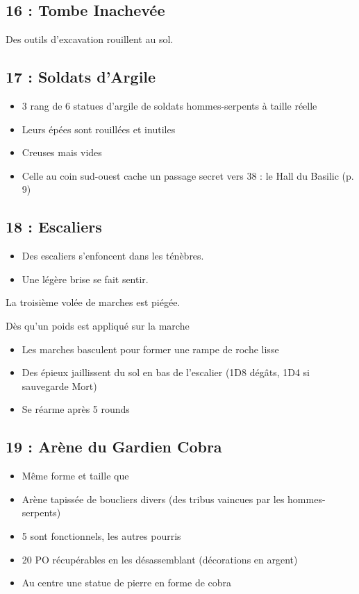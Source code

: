 \subsection{16 : Tombe Inachevée}\label{n2:s16}
Des outils d’excavation rouillent au sol.

\subsection{17 : Soldats d’Argile}\label{n2:s17}
\begin{itemize}
    \item 3 rang de 6 statues d’argile de soldats hommes-serpents à taille réelle
    \item Leurs épées sont rouillées et inutiles
    \item Creuses mais vides
    \item Celle au coin sud-ouest cache un passage secret vers 38 : le Hall du Basilic (p. 9)
\end{itemize}

\newpage

\subsection{18 : Escaliers}\label{n2:s18}
\begin{itemize}
    \item Des escaliers s’enfoncent dans les ténèbres.
    \item Une légère brise se fait sentir.
\end{itemize}

La troisième volée de marches est piégée.

\begin{highlight}[Piège]
Dès qu’un poids est appliqué sur la marche
\begin{itemize}
    \item Les marches basculent pour former une rampe de roche lisse
    \item Des épieux jaillissent du sol en bas de l’escalier (1D8 dégâts, 1D4 si sauvegarde Mort)
    \item Se réarme après 5 rounds
\end{itemize}
\end{highlight}

\subsection{19 : Arène du Gardien Cobra}\label{n2:s19}
\begin{itemize}
    \item Même forme et taille que 
    \item Arène tapissée de boucliers divers (des tribus vaincues par les hommes-serpents)
    \item 5 sont fonctionnels, les autres pourris
    \item 20 PO récupérables en les désassemblant (décorations en argent)
    \item Au centre une statue de pierre en forme de cobra
\end{itemize}

